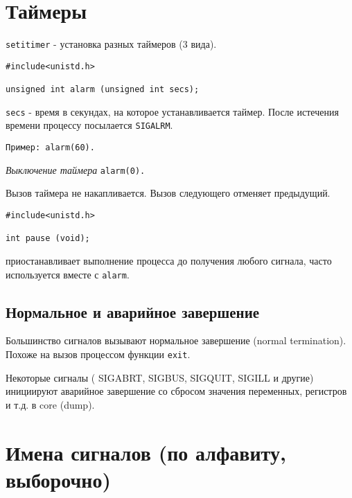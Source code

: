\section{Таймеры}

\verb+setitimer+ - установка разных таймеров (3 вида).

\begin{verbatim}
#include<unistd.h>

unsigned int alarm (unsigned int secs);
\end{verbatim}

\verb+secs+ - время в секундах, на которое устанавливается таймер. После истечения времени процессу посылается \verb+SIGALRM+.

\verb+Пример: alarm(60).+

\emph{Выключение таймера} \verb+alarm(0).+

Вызов таймера не накапливается. Вызов следующего отменяет предыдущий.

\begin{verbatim}
#include<unistd.h>

int pause (void);
\end{verbatim} 
приостанавливает выполнение процесса до получения любого сигнала, часто используется вместе с \verb+alarm+.

\subsection{Нормальное и аварийное завершение}

Большинство сигналов вызывают нормальное завершение (normal termination). Похоже на вызов процессом функции \verb+exit+.

Некоторые сигналы ( SIGABRT, SIGBUS, SIGQUIT, SIGILL и другие) инициируют аварийное завершение со сбросом значения переменных, регистров и т.д. в core (dump).

\section{Имена сигналов (по алфавиту, выборочно)}

